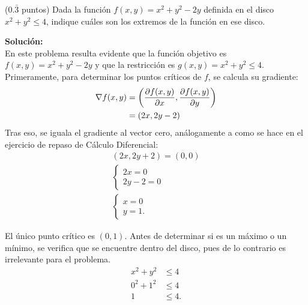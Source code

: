 \documentclass{fmbvecto}
\begin{document}
\begin{problema}[optimización]

    (\(0.\bar{3}\) puntos)  Dada la función \(f(x,y)=x^2+y^2-2y\) definida en el disco \(x^2+y^2\leq 4\), indique cuáles son los extremos de la función en ese disco. 

\vspace{1em}
\tcblower
\textbf{Solución:}\\

    En este problema resulta evidente que la función objetivo es \(f(x,y)=x^2+y^2-2y\) y que la restricción es \(g(x, y) = x^2+y^2 \leq 4\). Primeramente, para determinar los puntos críticos de \(f\), se calcula su gradiente:
    \begin{align*}
        \nabla f(x,y) &= \left( \dparder[f(x,y)][x], \dparder[f(x,y)][y] \right) \\
    &= \left( 2x, 2y-2\right)
    \end{align*}
    Tras eso, se iguala el gradiente al vector cero, análogamente a como se hace en el ejercicio de repaso de Cálculo Diferencial:
    \begin{gather*}
        \left( 2x, 2y+2\right) = (0, 0) \\
        \begin{cases}
            2x = 0 \\
            2y-2 = 0
        \end{cases} \\
        \begin{cases}
            x = 0 \\
            y = 1.
        \end{cases}
    \end{gather*}


    El único punto crítico es \((0, 1)\). Antes de determinar si es un máximo o un mínimo, se verifica que se encuentre dentro del disco, pues de lo contrario es irrelevante para el problema.
    \begin{align*}
        x^2+y^2 &\leq 4 \\
        0^2+1^2 &\leq 4 \\
        1 &\leq 4.
    \end{align*}


\end{problema}
\end{document}
